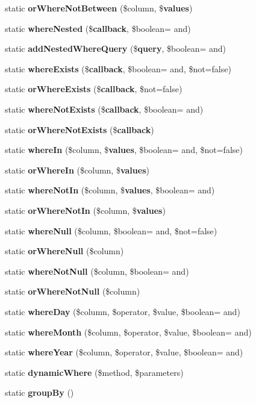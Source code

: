 \begin{DoxyCompactItemize}
\item 
static {\bf or\+Where\+Not\+Between} (\$column, \${\bf values})
\item 
static {\bf where\+Nested} (\${\bf callback}, \$boolean= \textquotesingle{}and\textquotesingle{})
\item 
static {\bf add\+Nested\+Where\+Query} (\${\bf query}, \$boolean= \textquotesingle{}and\textquotesingle{})
\item 
static {\bf where\+Exists} (\${\bf callback}, \$boolean= \textquotesingle{}and\textquotesingle{}, \$not=false)
\item 
static {\bf or\+Where\+Exists} (\${\bf callback}, \$not=false)
\item 
static {\bf where\+Not\+Exists} (\${\bf callback}, \$boolean= \textquotesingle{}and\textquotesingle{})
\item 
static {\bf or\+Where\+Not\+Exists} (\${\bf callback})
\item 
static {\bf where\+In} (\$column, \${\bf values}, \$boolean= \textquotesingle{}and\textquotesingle{}, \$not=false)
\item 
static {\bf or\+Where\+In} (\$column, \${\bf values})
\item 
static {\bf where\+Not\+In} (\$column, \${\bf values}, \$boolean= \textquotesingle{}and\textquotesingle{})
\item 
static {\bf or\+Where\+Not\+In} (\$column, \${\bf values})
\item 
static {\bf where\+Null} (\$column, \$boolean= \textquotesingle{}and\textquotesingle{}, \$not=false)
\item 
static {\bf or\+Where\+Null} (\$column)
\item 
static {\bf where\+Not\+Null} (\$column, \$boolean= \textquotesingle{}and\textquotesingle{})
\item 
static {\bf or\+Where\+Not\+Null} (\$column)
\item 
static {\bf where\+Day} (\$column, \$operator, \$value, \$boolean= \textquotesingle{}and\textquotesingle{})
\item 
static {\bf where\+Month} (\$column, \$operator, \$value, \$boolean= \textquotesingle{}and\textquotesingle{})
\item 
static {\bf where\+Year} (\$column, \$operator, \$value, \$boolean= \textquotesingle{}and\textquotesingle{})
\item 
static {\bf dynamic\+Where} (\$method, \$parameters)
\item 
static {\bf group\+By} ()
\item 

\end{DoxyCompactItemize}
